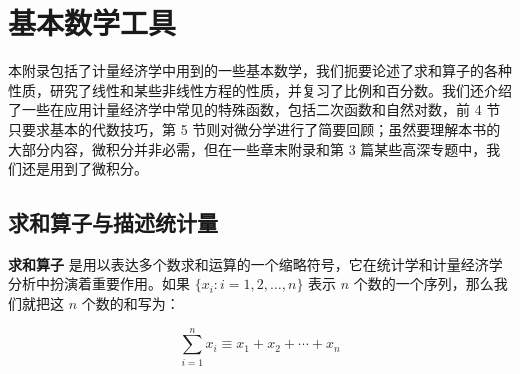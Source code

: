 \documentclass[color=blue,lang=cn,newtx,10pt,scheme=chinese]{elegantbook}
\begin{document}
\chapter{基本数学工具}


本附录包括了计量经济学中用到的一些基本数学，我们扼要论述了求和算子的各种性质，研究了线性和某些非线性方程的性质，并复习了比例和百分数。我们还介绍了一些在应用计量经济学中常见的特殊函数，包括二次函数和自然对数，前 4 节只要求基本的代数技巧，第 5 节则对微分学进行了简要回顾；虽然要理解本书的大部分内容，微积分并非必需，但在一些章末附录和第 3 篇某些高深专题中，我们还是用到了微积分。

\section{求和算子与描述统计量}

\textbf{求和算子} 是用以表达多个数求和运算的一个缩略符号，它在统计学和计量经济学分析中扮演着重要作用。如果 $\{x_i: i=1, 2, \ldots, n\}$ 表示 $n$ 个数的一个序列，那么我们就把这 $n$ 个数的和写为：

\begin{equation}
\sum_{i=1}^n x_i \equiv x_1 + x_2 +\cdots + x_n
\end{equation}
\end{document}
